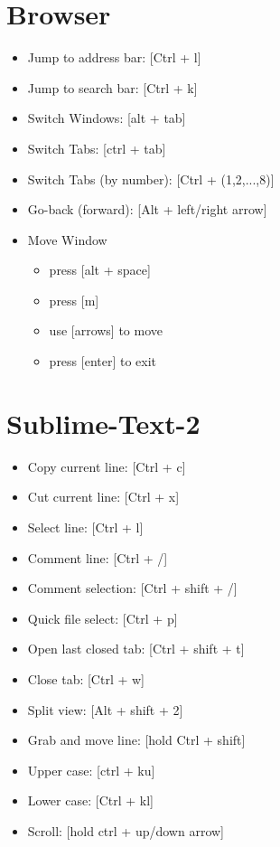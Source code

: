 \documentclass[11pt,twocolumn]{article}
\begin{document}
\scriptsize

\section*{Browser}
\begin{itemize}
	\item Jump to address bar: [Ctrl + l]
	\item Jump to search bar: [Ctrl + k]
	\item Switch Windows: [alt + tab]
	\item Switch Tabs: [ctrl + tab]
	\item Switch Tabs (by number): [Ctrl + (1,2,...,8)]
	\item Go-back (forward): [Alt + left/right arrow]
	\item Move Window
	\begin{itemize}
		\item press [alt + space]
		\item press [m]
		\item use [arrows] to move
		\item press [enter] to exit
	\end{itemize}
\end{itemize}

\section*{Sublime-Text-2}
\begin{itemize}
	\item Copy current line: [Ctrl + c]
	\item Cut current line: [Ctrl + x]
	\item Select line: [Ctrl + l]
	\item Comment line: [Ctrl + /]
	\item Comment selection: [Ctrl + shift + /]
	\item Quick file select: [Ctrl + p]
	\item Open last closed tab: [Ctrl + shift + t]
	\item Close tab: [Ctrl + w]
	\item Split view: [Alt + shift + 2]
	\item Grab and move line: [hold Ctrl + shift]
	\item Upper case: [ctrl + ku]
	\item Lower case: [Ctrl + kl]
	\item Scroll: [hold ctrl + up/down arrow]
\end{itemize}
\end{document}
